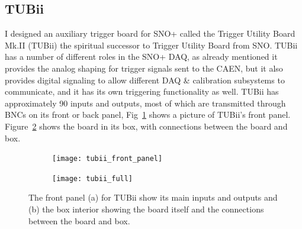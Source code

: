 
\subsection{TUBii}
\label{sec:tubii}
I designed an auxiliary trigger board for SNO+ called the Trigger
Utility Board Mk.II (TUBii) the spiritual successor to Trigger Utility Board
from SNO\@. 
TUBii has a number of different roles in the SNO+ DAQ, as already mentioned it
provides the analog shaping for trigger signals sent to the CAEN, but
it also provides digital signaling to allow different DAQ \& calibration subsystems
to communicate, and it has its own triggering functionality as well.
TUBii has approximately 90 inputs and outputs, most of which are
transmitted through BNCs on its front or back panel, Fig~\ref{fig:tubii_front_panel}
shows a picture of TUBii's front panel.
Figure~\ref{fig:tubii_full} shows the board in its box, with connections
between the board and box.
\begin{figure}[htbp]
    \centering
    \begin{subfigure}[b]{0.48\textwidth}
        \centering
    \texttt{[image: tubii\_front\_panel]}
    \caption[]{}
    \label{fig:tubii_front_panel}
    \end{subfigure}
    \begin{subfigure}[b]{0.48\textwidth}
        \centering
    \texttt{[image: tubii\_full]}
    \caption[]{}
        \label{fig:tubii_full}
    \end{subfigure}
    \caption[TUBii Board and Box]{The front panel (a) for
    TUBii show its main inputs and outputs and (b) the box interior 
    showing the board itself and the connections between the board and box.}
    \label{fig:tubii_pictures}
\end{figure}

